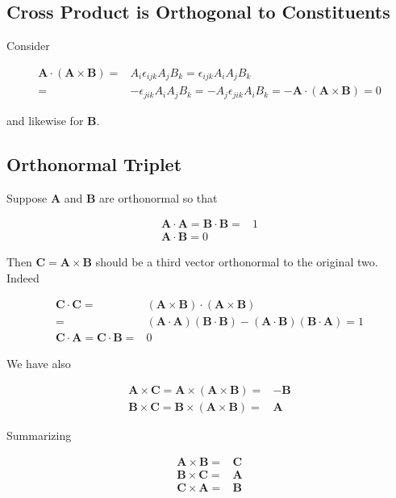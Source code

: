 \documentclass[12pt]{article}
\newcommand{\ep}{\epsilon}
\renewcommand{\vec}[1]{\boldsymbol{#1}}
\begin{document}
\subsection{Cross Product is Orthogonal to Constituents}

Consider

\begin{align}
\vec{A}\cdot(\vec{A}\times\vec{B}) =& A_i \ep_{ijk} A_jB_k = \ep_{ijk} A_i A_j B_k\\
=& -\ep_{jik} A_i A_j B_k = -A_j\ep_{jik}A_i B_k = -\vec{A}\cdot(\vec{A}\times\vec{B}) = 0
\end{align}

and likewise for $\vec{B}$.

\subsection{Orthonormal Triplet}

Suppose $\vec{A}$ and $\vec{B}$ are orthonormal so that

\begin{align}
\vec{A}\cdot\vec{A} = \vec{B}\cdot\vec{B} =& 1\\
\vec{A}\cdot\vec{B} = 0
\end{align}

Then $\vec{C}=\vec{A}\times\vec{B}$ should be a third vector orthonormal to the original two.
Indeed

\begin{align}
\vec{C}\cdot\vec{C} =& (\vec{A}\times\vec{B})\cdot(\vec{A}\times\vec{B})\\
=& (\vec{A}\cdot\vec{A})(\vec{B}\cdot\vec{B}) - (\vec{A}\cdot\vec{B})(\vec{B}\cdot\vec{A}) = 1\\
\vec{C}\cdot\vec{A} = \vec{C}\cdot\vec{B} =& 0
\end{align}

We have also

\begin{align}
\vec{A}\times\vec{C} = \vec{A}\times(\vec{A}\times\vec{B}) =& -\vec{B}\\
\vec{B}\times\vec{C} = \vec{B}\times(\vec{A}\times\vec{B}) =& \vec{A}
\end{align}

Summarizing

\begin{align}
\vec{A}\times\vec{B} =& \vec{C}\\
\vec{B}\times\vec{C} =& \vec{A}\\
\vec{C}\times\vec{A} =& \vec{B}
\end{align}
\end{document}
